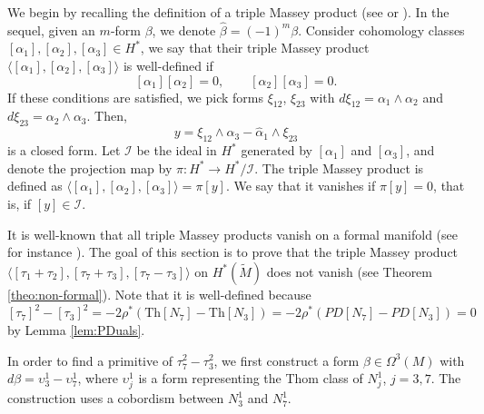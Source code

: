 \documentclass[10pt]{article}
\newcommand{\la}{\langle}
\newcommand{\ra}{\rangle}
\theoremstyle{plain}
\theoremstyle{definition}
\theoremstyle{remark}
\begin{document}
We begin by recalling the definition of a triple Massey product (see \cite[Definition 2.89]{FOT} or \cite[Definition 6.1]{OT}). In the sequel, given an $m$-form $\beta$, we denote $
\hat{\beta}=(-1)^{m}\beta.
$
Consider cohomology classes $[\alpha_1],[\alpha_2],[\alpha_3]\in H^*$, we say that their triple Massey product $\la [\alpha_1] ,[\alpha_2],[\alpha_3]\ra$ is well-defined if
$$
[\alpha_1][\alpha_2]=0, \qquad  [\alpha_2][\alpha_3]=0. 
$$
If these conditions are satisfied, we pick forms $\xi_{12}$, $\xi_{23}$ with $d\xi_{12}= {\alpha}_1 \wedge \alpha_2$ and  $d\xi_{23}= {\alpha}_2 \wedge \alpha_3$. Then, 
\begin{equation} \label{eqn:closed-Massey}
    y= \xi_{12} \wedge \alpha_3 - \hat{\alpha}_1 \wedge  {\xi}_{23}
\end{equation}
is a closed form. Let $\mathcal{I}$ be the ideal in $H^*$ generated by $[\alpha_1]$ and $[\alpha_3]$, and denote the projection map by $\pi \colon H^* \to H^*/\mathcal{I}$.
The triple Massey product is defined as $\la [\alpha_1] ,[\alpha_2],[\alpha_3]\ra= \pi[y]$. We say that it vanishes if $\pi[y]=0$, that is, if $[y]\in \mathcal{I}$.

It is well-known that all triple Massey products vanish on a formal manifold (see for instance \cite[Proposition 2.90]{FOT}). The goal of this section is to prove that the triple Massey product 
$\la [\tau_1 + \tau_2], [\tau_7+ \tau_3], [\tau_7-\tau_3] \ra$
on $H^*(\widetilde{M})$ does not vanish (see Theorem \ref{theo:non-formal}). Note that it is well-defined because $[\tau_7]^2-[\tau_3]^2=-2\rho^*(\mathrm{Th}[N_7]-\mathrm{Th}[N_3])=-2\rho^*(PD[N_7]-PD[N_3])=0$ by Lemma \ref{lem:PDuals}.

In order to find a primitive of $\tau_7^2-\tau_3^2$, we first construct a form $\beta \in \Omega^3(M)$ with $d\beta=\upsilon_3^1-\upsilon_7^1$, where $\upsilon_j^1$ is a form representing the Thom class of $N_j^1$, $j=3,7$. The construction uses a cobordism between $N_3^1$ and $N_7^1$.
\end{document}
